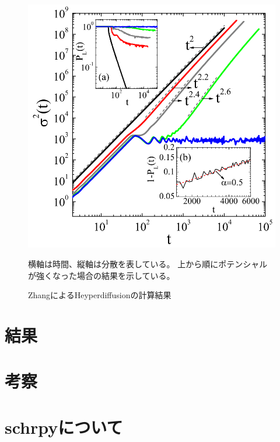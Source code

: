 \documentclass[autodetect-engine,dvipdfmx-if-dvi,ja=standard,a4paper,layout=v2]{bxjsreport}
\begin{document}
    \begin{figure}[h]
      \centering
      \includegraphics[width=70truemm]{figure_3.png}
      \caption{ZhangによるHeyperdiffusionの計算結果}
      \label{Zhang}
      \footnotesize{横軸は時間、縦軸は分散を表している。
      上から順にポテンシャルが強くなった場合の結果を示している。}
    \end{figure}
    \chapter{結果}
    \chapter{考察}
    \chapter{schrpyについて}
\end{document}
